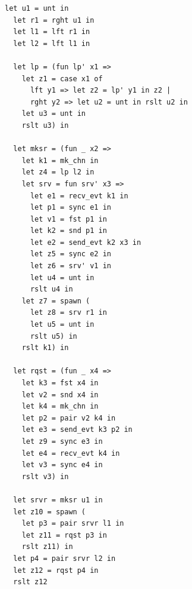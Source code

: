 \documentclass{article}
\begin{document}
\begin{lstlisting}[language=normal_lang, mathescape]
  let u1 = unt in
  let r1 = rght u1 in
  let l1 = lft r1 in
  let l2 = lft l1 in

  let lp = (fun lp' x1 => 
    let z1 = case x1 of 
      lft y1 => let z2 = lp' y1 in z2 |
      rght y2 => let u2 = unt in rslt u2 in
    let u3 = unt in
    rslt u3) in

  let mksr = (fun _ x2 => 
    let k1 = mk_chn in
    let z4 = lp l2 in
    let srv = fun srv' x3 =>
      let e1 = recv_evt k1 in
      let p1 = sync e1 in
      let v1 = fst p1 in
      let k2 = snd p1 in 
      let e2 = send_evt k2 x3 in
      let z5 = sync e2 in
      let z6 = srv' v1 in
      let u4 = unt in
      rslt u4 in
    let z7 = spawn (
      let z8 = srv r1 in
      let u5 = unt in
      rslt u5) in
    rslt k1) in

  let rqst = (fun _ x4 =>
    let k3 = fst x4 in
    let v2 = snd x4 in
    let k4 = mk_chn in
    let p2 = pair v2 k4 in
    let e3 = send_evt k3 p2 in
    let z9 = sync e3 in
    let e4 = recv_evt k4 in
    let v3 = sync e4 in
    rslt v3) in

  let srvr = mksr u1 in
  let z10 = spawn ( 
    let p3 = pair srvr l1 in
    let z11 = rqst p3 in
    rslt z11) in
  let p4 = pair srvr l2 in
  let z12 = rqst p4 in
  rslt z12
  \end{lstlisting}
\end{document}
